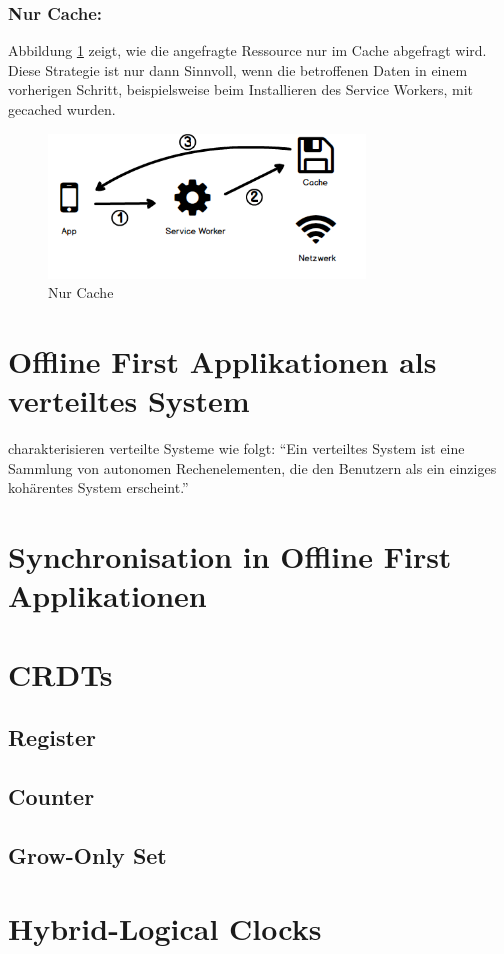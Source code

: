 \documentclass[a4paper, 12pt]{scrreprt}
\begin{document}
\subsubsection{Nur Cache:}
Abbildung \ref{fig:cachingCacheOnly} zeigt, wie die angefragte Ressource nur im Cache abgefragt wird. Diese Strategie ist nur dann Sinnvoll, wenn die betroffenen Daten in einem vorherigen Schritt, beispielsweise beim Installieren des Service Workers, mit gecached wurden.

\begin{figure}[h]
	\centering
	\includegraphics[width=0.75\textwidth]{cacheonly.png}
	\caption{Nur Cache}
	\label{fig:cachingCacheOnly}
\end{figure}

\section{Offline First Applikationen als verteiltes System}
\autocite{ArticleDistributedSystems} charakterisieren verteilte Systeme wie folgt: \enquote{Ein verteiltes System ist eine Sammlung von autonomen Rechenelementen, die den Benutzern als ein einziges kohärentes System erscheint.}

\section{Synchronisation in Offline First Applikationen}
\section{CRDTs}
\subsection{Register}
\subsection{Counter}
\subsection{Grow-Only Set}
\section{Hybrid-Logical Clocks}

\newpage
\printbibliography
\end{document}
